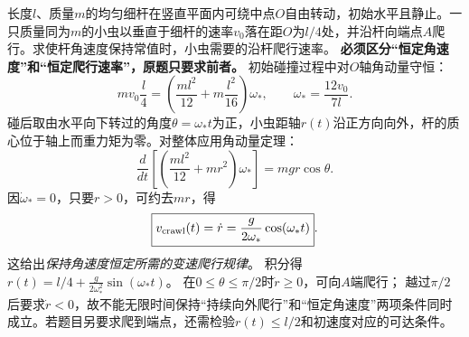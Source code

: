 \problemtext 长度$l$、质量$m$的均匀细杆在竖直平面内可绕中点$O$自由转动，初始水平且静止。一只质量同为$m$的小虫以垂直于细杆的速率$v_0$落在距$O$为$l/4$处，并沿杆向端点$A$爬行。求使杆角速度保持常值时，小虫需要的沿杆爬行速率。
\workings
\textbf{必须区分“恒定角速度”和“恒定爬行速率”，原题只要求前者。}
初始碰撞过程中对$O$轴角动量守恒：
\[
m v_0\frac l4
=\left(\frac{ml^2}{12}+m\frac{l^2}{16}\right)\omega_*,
\qquad \boxed{\omega_*=\frac{12v_0}{7l}}.
\]
碰后取由水平向下转过的角度$\theta=\omega_* t$为正，小虫距轴$r(t)$沿正方向向外，杆的质心位于轴上而重力矩为零。对整体应用角动量定理：
\[
\frac{d}{dt}\left[\left(\frac{ml^2}{12}+mr^2\right)\omega_*\right]
=mg r\cos\theta.
\]
因$\dot\omega_*=0$，只要$r>0$，可约去$mr$，得
\[
\boxed{v_{\rm crawl}(t)=\dot r
=\frac{g}{2\omega_*}\cos(\omega_*t)}.
\]
这给出\emph{保持角速度恒定所需的变速爬行规律}。
积分得
$r(t)=l/4+\frac{g}{2\omega_*^2}\sin(\omega_*t)$。
\crosscheck 在$0\le\theta\le\pi/2$时$\dot r\ge0$，可向$A$端爬行；
越过$\pi/2$后要求$\dot r<0$，故不能无限时间保持“持续向外爬行”和“恒定角速度”两项条件同时成立。若题目另要求爬到端点，还需检验$r(t)\le l/2$和初速度对应的可达条件。
